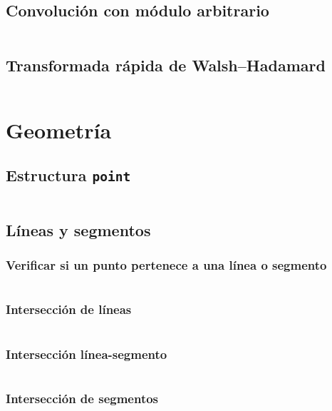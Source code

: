 \documentclass[11pt]{article}
\begin{document}
		\subsection{Convolución con módulo arbitrario}
		\inputminted[tabsize=2,breaklines,firstline=358,lastline=415,fontsize=\small]{c++}{fft.cpp}
		
		\subsection{Transformada rápida de Walsh–Hadamard}
		\inputminted[tabsize=2,breaklines,firstline=417,lastline=448,fontsize=\small]{c++}{fft.cpp}
			
	\newpage
	\section{Geometría}
		\subsection{Estructura \texttt{point}}
		\inputminted[tabsize=2,breaklines,firstline=4,lastline=97,fontsize=\small]{c++}{geometry.cpp}
		
		\subsection{Líneas y segmentos}
			\subsubsection{Verificar si un punto pertenece a una línea o segmento}
			\inputminted[tabsize=2,breaklines,firstline=102,lastline=111,fontsize=\small]{c++}{geometry.cpp}
			
			\subsubsection{Intersección de líneas}
			\inputminted[tabsize=2,breaklines,firstline=113,lastline=133,fontsize=\small]{c++}{geometry.cpp}
			
			\subsubsection{Intersección línea-segmento}
			\inputminted[tabsize=2,breaklines,firstline=135,lastline=148,fontsize=\small]{c++}{geometry.cpp}
			
			\subsubsection{Intersección de segmentos}
			\inputminted[tabsize=2,breaklines,firstline=150,lastline=167,fontsize=\small]{c++}{geometry.cpp}
			
\end{document}
